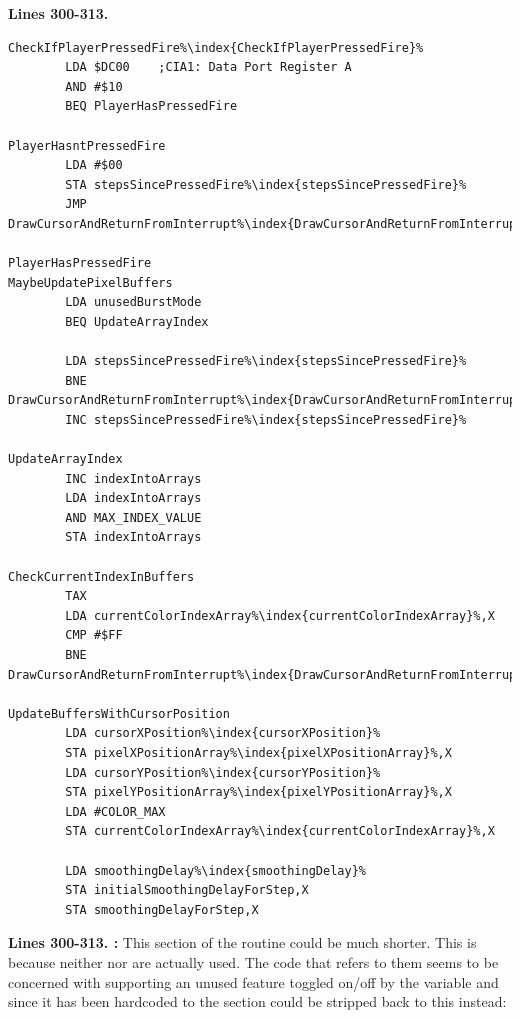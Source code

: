 \clearpage
\textbf{Lines 300-313. }
\begin{lstlisting}[caption= Third part of the Interrupt Handler.,escapechar=\%]
CheckIfPlayerPressedFire%\index{CheckIfPlayerPressedFire}%   
        LDA $DC00    ;CIA1: Data Port Register A
        AND #$10
        BEQ PlayerHasPressedFire

PlayerHasntPressedFire
        LDA #$00
        STA stepsSincePressedFire%\index{stepsSincePressedFire}%
        JMP DrawCursorAndReturnFromInterrupt%\index{DrawCursorAndReturnFromInterrupt}%

PlayerHasPressedFire
MaybeUpdatePixelBuffers   
        LDA unusedBurstMode
        BEQ UpdateArrayIndex

        LDA stepsSincePressedFire%\index{stepsSincePressedFire}%
        BNE DrawCursorAndReturnFromInterrupt%\index{DrawCursorAndReturnFromInterrupt}%
        INC stepsSincePressedFire%\index{stepsSincePressedFire}%

UpdateArrayIndex   
        INC indexIntoArrays
        LDA indexIntoArrays
        AND MAX_INDEX_VALUE
        STA indexIntoArrays

CheckCurrentIndexInBuffers  
        TAX 
        LDA currentColorIndexArray%\index{currentColorIndexArray}%,X
        CMP #$FF
        BNE DrawCursorAndReturnFromInterrupt%\index{DrawCursorAndReturnFromInterrupt}%

UpdateBuffersWithCursorPosition
        LDA cursorXPosition%\index{cursorXPosition}%
        STA pixelXPositionArray%\index{pixelXPositionArray}%,X
        LDA cursorYPosition%\index{cursorYPosition}%
        STA pixelYPositionArray%\index{pixelYPositionArray}%,X
        LDA #COLOR_MAX
        STA currentColorIndexArray%\index{currentColorIndexArray}%,X

        LDA smoothingDelay%\index{smoothingDelay}%
        STA initialSmoothingDelayForStep,X
        STA smoothingDelayForStep,X

\end{lstlisting}
\clearpage

\textbf{Lines 300-313. :} This section of the routine could be much shorter. This
is because neither  nor  are actually used. The code that refers
to them seems to be concerned with supporting an unused feature toggled on/off by the variable 
and since it has been hardcoded to  the section could be stripped back to this instead:

